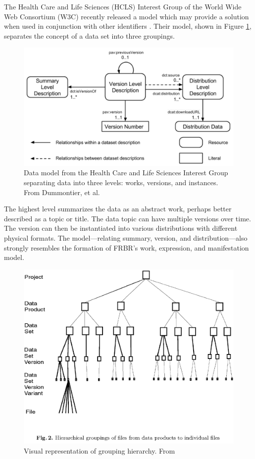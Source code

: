 The Health Care and Life Sciences (HCLS) Interest Group of the World Wide Web Consortium (W3C) recently released a model which may provide a solution when used in conjunction with other identifiers \cite{Dummontier2016}.
Their model, shown in Figure \ref{HCLSModel}, separates the concept of a data set into three groupings.
\begin{figure}%
	\centering
	\includegraphics[scale=0.34]{figures/HCLSModel.png}
	\caption[Data model from the Health Care and Life Sciences Interest Group separating data into three levels: works, versions, and instances.]{Data model from the Health Care and Life Sciences Interest Group separating data into three levels: works, versions, and instances.  From Dummontier, et al. \cite{Dummontier2016}}
	\label{HCLSModel}
\end{figure}
The highest level summarizes the data as an abstract work, perhaps better described as a topic or title.
The data topic can have multiple versions over time.
The version can then be instantiated into various distributions with different physical formats.
The model---relating summary, version, and distribution---also strongly resembles the formation of FRBR's work, expression, and manifestation model.

\begin{figure}
	\centering
	\includegraphics[scale=0.50]{figures/hierarchy.png}
	\caption[Visual representation of grouping hierarchy.]{Visual representation of grouping hierarchy.  From \cite{Barkstrom2003}}
	\label{hierarchy}
\end{figure}

